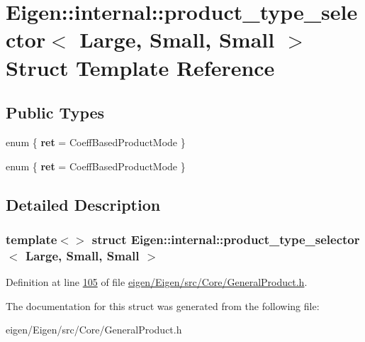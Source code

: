 \hypertarget{struct_eigen_1_1internal_1_1product__type__selector_3_01_large_00_01_small_00_01_small_01_4}{}\section{Eigen\+:\+:internal\+:\+:product\+\_\+type\+\_\+selector$<$ Large, Small, Small $>$ Struct Template Reference}
\label{struct_eigen_1_1internal_1_1product__type__selector_3_01_large_00_01_small_00_01_small_01_4}
\subsection*{Public Types}
\begin{DoxyCompactItemize}
\item 
\mbox{\label{struct_eigen_1_1internal_1_1product__type__selector_3_01_large_00_01_small_00_01_small_01_4_a9cf50d36b179e5537941b568ed1f46c0}} 
enum \{ {\bfseries ret} = Coeff\+Based\+Product\+Mode
 \}
\item 
\mbox{\label{struct_eigen_1_1internal_1_1product__type__selector_3_01_large_00_01_small_00_01_small_01_4_acb55762217ebb6c201c7e5ccf41f0889}} 
enum \{ {\bfseries ret} = Coeff\+Based\+Product\+Mode
 \}
\end{DoxyCompactItemize}


\subsection{Detailed Description}
\subsubsection*{template$<$$>$\newline
struct Eigen\+::internal\+::product\+\_\+type\+\_\+selector$<$ Large, Small, Small $>$}



Definition at line \hyperlink{eigen_2_eigen_2src_2_core_2_general_product_8h_source_l00105}{105} of file \hyperlink{eigen_2_eigen_2src_2_core_2_general_product_8h_source}{eigen/\+Eigen/src/\+Core/\+General\+Product.\+h}.



The documentation for this struct was generated from the following file\+:\begin{DoxyCompactItemize}
\item 
eigen/\+Eigen/src/\+Core/\+General\+Product.\+h\end{DoxyCompactItemize}
